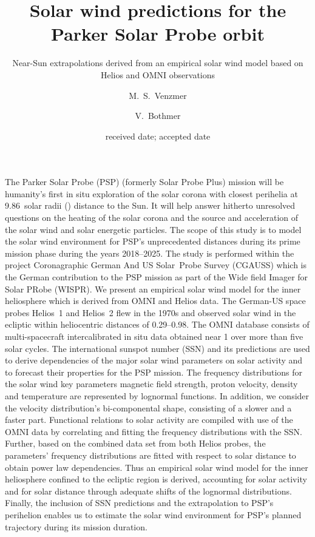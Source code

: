 
\title{Solar wind predictions for the Parker Solar Probe orbit}
\subtitle{Near-Sun extrapolations derived from an empirical solar wind model based on Helios and OMNI observations}

\author{M.~S.~Venzmer
\and V.~Bothmer}


\date{received date; accepted date}

\abstract
{The Parker Solar Probe (PSP) (formerly Solar Probe Plus) mission will be humanity’s first in situ exploration of the solar corona with closest perihelia at \num{9.86}~solar radii (\si{\Rs}) distance to the Sun. It will help answer hitherto unresolved questions on the heating of the solar corona and the source and acceleration of the solar wind and solar energetic particles. The scope of this study is to model the solar wind environment for PSP’s unprecedented distances during its prime mission phase during the years \numrange{2018}{2025}. The study is performed within the project Coronagraphic German And US Solar~Probe Survey (CGAUSS) which is the German contribution to the PSP mission as part of the Wide field Imager for Solar PRobe (WISPR).}	%
{We present an empirical solar wind model for the inner heliosphere which is derived from OMNI and Helios data. The German-US space probes Helios~1 and Helios~2 flew in the 1970s and observed solar wind in the ecliptic within heliocentric distances of \SIrange{0.29}{0.98}{\au}. The OMNI database consists of multi-spacecraft intercalibrated in situ data obtained near \SI{1}{\au} over more than five solar cycles. The international sunspot number (SSN) and its predictions are used to derive dependencies of the major solar wind parameters on solar activity and to forecast their properties for the PSP mission.}	%
{The frequency distributions for the solar wind key parameters magnetic field strength, proton velocity, density and temperature are represented by lognormal functions. In addition, we consider the velocity distribution’s bi-componental shape, consisting of a slower and a faster part. Functional relations to solar activity are compiled with use of the OMNI data by correlating and fitting the frequency distributions with the SSN. Further, based on the combined data set from both Helios probes, the parameters’ frequency distributions are fitted with respect to solar distance to obtain power law dependencies. Thus an empirical solar wind model for the inner heliosphere confined to the ecliptic region is derived, accounting for solar activity and for solar distance through adequate shifts of the lognormal distributions. Finally, the inclusion of SSN predictions and the extrapolation to PSP’s perihelion enables us to estimate the solar wind environment for PSP’s planned trajectory during its mission duration.}	%

